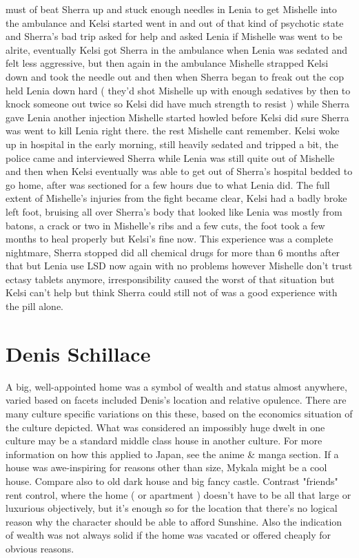 \documentclass[12pt]{book}
\begin{document}
must of beat Sherra up and stuck enough needles in Lenia to get Mishelle into the ambulance and Kelsi started went in and out of that kind of psychotic state and Sherra's bad trip asked for help and asked Lenia if Mishelle was went to be alrite, eventually Kelsi got Sherra in the ambulance when Lenia was sedated and felt less aggressive, but then again in the ambulance Mishelle strapped Kelsi down and took the needle out and then when Sherra began to freak out the cop held Lenia down hard ( they'd shot Mishelle up with enough sedatives by then to knock someone out twice so Kelsi did have much strength to resist ) while Sherra gave Lenia another injection Mishelle started howled before Kelsi did sure Sherra was went to kill Lenia right there. the rest Mishelle cant remember. Kelsi woke up in hospital in the early morning, still heavily sedated and tripped a bit, the police came and interviewed Sherra while Lenia was still quite out of Mishelle and then when Kelsi eventually was able to get out of Sherra's hospital bedded to go home, after was sectioned for a few hours due to what Lenia did. The full extent of Mishelle's injuries from the fight became clear, Kelsi had a badly broke left foot, bruising all over Sherra's body that looked like Lenia was mostly from batons, a crack or two in Mishelle's ribs and a few cuts, the foot took a few months to heal properly but Kelsi's fine now. This experience was a complete nightmare, Sherra stopped did all chemical drugs for more than 6 months after that but Lenia use LSD now again with no problems however Mishelle don't trust ectasy tablets anymore, irresponsibility caused the worst of that situation but Kelsi can't help but think Sherra could still not of was a good experience with the pill alone.



\chapter{Denis Schillace}

A big, well-appointed home was a symbol of wealth and status almost anywhere, varied based on facets included Denis's location and relative opulence. There are many culture specific variations on this these, based on the economics situation of the culture depicted. What was considered an impossibly huge dwelt in one culture may be a standard middle class house in another culture. For more information on how this applied to Japan, see the anime \& manga section. If a house was awe-inspiring for reasons other than size, Mykala might be a cool house. Compare also to old dark house and big fancy castle. Contrast "friends" rent control, where the home ( or apartment ) doesn't have to be all that large or luxurious objectively, but it's enough so for the location that there's no logical reason why the character should be able to afford Sunshine. Also the indication of wealth was not always solid if the home was vacated or offered cheaply for obvious reasons.
\end{document}
